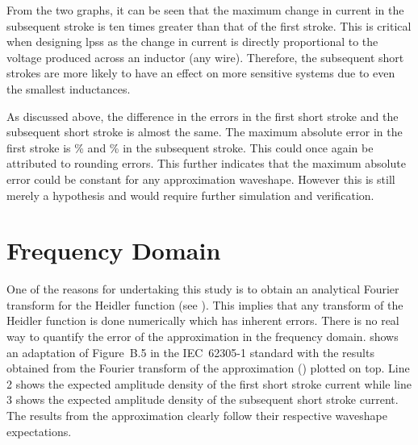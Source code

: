 From the two graphs, it can be seen that the maximum change in current in the subsequent stroke is ten times greater than that of the first stroke. This is critical when designing \glspl{lps} as the change in current is directly proportional to the voltage produced across an inductor (any wire). Therefore, the subsequent short strokes are more likely to have an effect on more sensitive systems due to even the smallest inductances.

As discussed above, the difference in the errors in the first short stroke and the subsequent short stroke is almost the same. The maximum absolute error in the first stroke is \unskip \% and \unskip \% in the subsequent stroke. This could once again be attributed to rounding errors. This further indicates that the maximum absolute error could be constant for any approximation waveshape. However this is still merely a hypothesis and would require further simulation and verification.


\section{Frequency Domain}
\label{sec:discussion_frequency_domain}
One of the reasons for undertaking this study is to obtain an analytical Fourier transform for the Heidler function (see ). This implies that any transform of the Heidler function is done numerically which has inherent errors. There is no real way to quantify the error of the approximation in the frequency domain.  shows an adaptation of Figure~B.5 in the IEC~62305-1 standard with the results obtained from the Fourier transform of the approximation () plotted on top.
Line 2 shows the expected amplitude density of the first short stroke current while line 3 shows the expected amplitude density of the subsequent short stroke current. The results from the approximation clearly follow their respective waveshape expectations.


